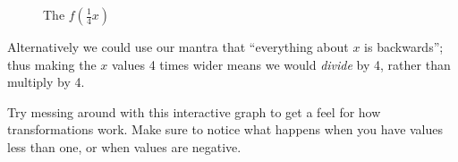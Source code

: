 \documentclass{ximera}
\begin{document}
    \begin{figure}[H]\centering
        \caption{The $f\left(\frac{1}{4}x\right)$}
    \end{figure}
    
    Alternatively we could use our mantra that ``everything about $x$ is backwards''; thus making the $x$ values 4 times wider means we would \textit{divide} by 4, rather than multiply by 4.
    
    Try messing around with this interactive graph to get a feel for how transformations work. Make sure to notice what happens when you have values less than one, or when values are negative.
    
    
\end{document}
